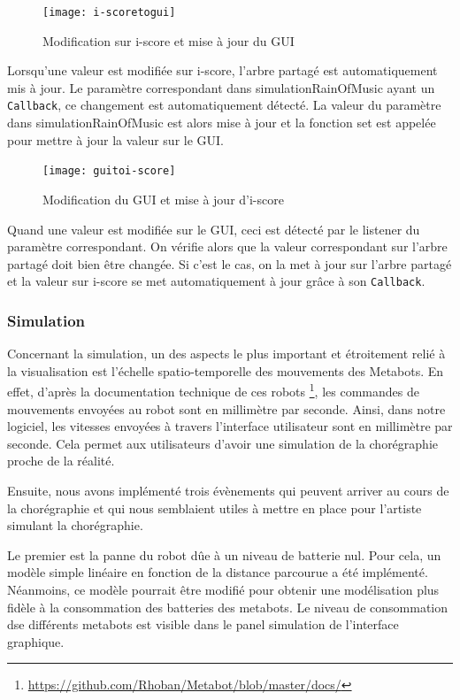 \begin{figure}[H]
\begin{center}
\texttt{[image: i-scoretogui]}
\caption{Modification sur i-score et mise à jour du GUI}
\label{diag1}
\end{center}
\end{figure}

Lorsqu'une valeur est modifiée sur i-score, l'arbre partagé est automatiquement mis à jour. Le paramètre correspondant dans simulationRainOfMusic ayant un \verb|Callback|, ce changement est automatiquement détecté. La valeur du paramètre dans simulationRainOfMusic est alors mise à jour et la fonction set est appelée pour mettre à jour la valeur sur le GUI.

\begin{figure}[H]
\begin{center}
\texttt{[image: guitoi-score]}
\caption{Modification du GUI et mise à jour d'i-score}
\label{diag2}
\end{center}
\end{figure}

Quand une valeur est modifiée sur le GUI, ceci est détecté par le listener du paramètre correspondant. On vérifie alors que la valeur correspondant sur l'arbre partagé doit bien être changée. Si c'est le cas, on la met à jour sur l'arbre partagé et la valeur sur i-score se met automatiquement à jour grâce à son \verb|Callback|. 

\subsubsection{Simulation}

Concernant la simulation, un des aspects le plus important et étroitement relié à la visualisation est l'échelle spatio-temporelle des mouvements des Metabots. En effet, d'après la documentation technique de ces robots \footnote{\url{https://github.com/Rhoban/Metabot/blob/master/docs/}}, les commandes de mouvements envoyées au robot sont en millimètre par seconde. Ainsi, dans notre logiciel, les vitesses envoyées à travers l'interface utilisateur sont en millimètre par seconde. Cela permet aux utilisateurs d'avoir une simulation de la chorégraphie proche de la réalité.

Ensuite, nous avons implémenté trois évènements qui peuvent arriver au cours de la chorégraphie et qui nous semblaient utiles à mettre en place pour l'artiste simulant la chorégraphie. 

Le premier est la panne du robot dûe à un niveau de batterie nul. Pour cela, un modèle simple linéaire en fonction de la distance parcourue a été implémenté. Néanmoins, ce modèle pourrait être modifié pour obtenir une modélisation plus fidèle à la consommation des batteries des metabots. Le niveau de consommation dse différents metabots est visible dans le panel simulation de l'interface graphique. 

